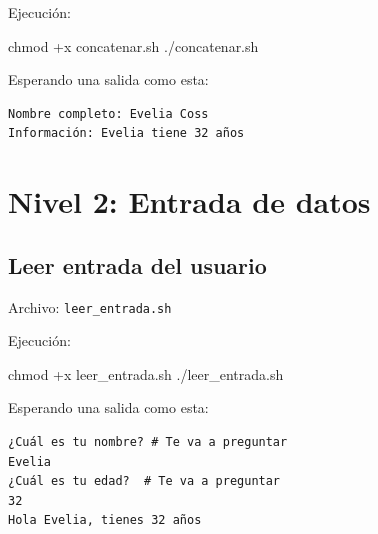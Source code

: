 \documentclass[
  spanish,
  12pt,
  letterpaper,
  DIV=11,
  numbers=noendperiod]{scrreprt}
\newenvironment{Shaded}{\begin{snugshade}}{\end{snugshade}}
\newcommand{\BuiltInTok}[1]{\textcolor[rgb]{0.00,0.23,0.31}{#1}}
\newcommand{\CommentTok}[1]{\textcolor[rgb]{0.37,0.37,0.37}{#1}}
\newcommand{\ExtensionTok}[1]{\textcolor[rgb]{0.00,0.23,0.31}{#1}}
\newcommand{\FunctionTok}[1]{\textcolor[rgb]{0.28,0.35,0.67}{#1}}
\newcommand{\NormalTok}[1]{\textcolor[rgb]{0.00,0.23,0.31}{#1}}
\newcommand{\StringTok}[1]{\textcolor[rgb]{0.13,0.47,0.30}{#1}}
\newcommand{\VariableTok}[1]{\textcolor[rgb]{0.07,0.07,0.07}{#1}}
\begin{document}
Ejecución:

\begin{Shaded}
\begin{Highlighting}[]
\FunctionTok{chmod}\NormalTok{ +x concatenar.sh}
\ExtensionTok{./concatenar.sh}
\end{Highlighting}
\end{Shaded}

Esperando una salida como esta:

\begin{verbatim}
Nombre completo: Evelia Coss
Información: Evelia tiene 32 años
\end{verbatim}

\section{\texorpdfstring{\textbf{Nivel 2: Entrada de
datos}}{Nivel 2: Entrada de datos}}\label{nivel-2-entrada-de-datos}

\subsection{Leer entrada del usuario}\label{leer-entrada-del-usuario}

Archivo: \texttt{leer\_entrada.sh}

\begin{Shaded}
\end{Shaded}

Ejecución:

\begin{Shaded}
\begin{Highlighting}[]
\FunctionTok{chmod}\NormalTok{ +x leer\_entrada.sh}
\ExtensionTok{./leer\_entrada.sh}
\end{Highlighting}
\end{Shaded}

Esperando una salida como esta:

\begin{verbatim}
¿Cuál es tu nombre? # Te va a preguntar 
Evelia
¿Cuál es tu edad?  # Te va a preguntar 
32
Hola Evelia, tienes 32 años
\end{verbatim}
\end{document}
